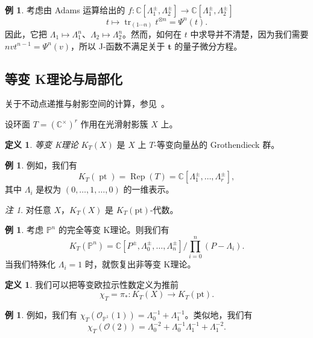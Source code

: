 \documentclass{amsart}
\theoremstyle{definition}
\newtheorem{defn}[thm]{定义}
\newtheorem{exm}[thm]{例}
\theoremstyle{remark}
\newtheorem{rmk}[thm]{注}
\theoremstyle{plain}
\theoremstyle{definition}
\theoremstyle{remark}
\newcommand{\C}{\mathbb{C}}
\renewcommand{\P}{\mathbb{P}}
\newcommand{\mc}[1]{\mathcal{#1}}
\newcommand{\mr}[1]{\mathrm{#1}}
\newcommand{\on}[1]{\operatorname{#1}}
\newcommand{\1}{\mathbf{1}}
\newcommand{\2}{\mathbf{2}}
\newcommand{\3}{\mathbf{3}}
\begin{document}
\begin{exm}
    考虑由 Adams 运算给出的 \(f \colon \C[\Lambda_1^{\pm}, \Lambda_2^{\pm}] \to \C[\Lambda_1^{\pm}, \Lambda_2^{\pm}]\)
    \[ t \mapsto \on{tr}_{(1\cdots n)} t^{\otimes n} = \Psi^n (t). \]
    因此，它把 \(\Lambda_1 \mapsto \Lambda_1^n\)、\(\Lambda_2 \mapsto \Lambda_2^n\)。然而，如何在 \(t\) 中求导并不清楚，因为我们需要 \(nv t^{n-1} = \Psi^n(v)\)，所以 J-函数不满足关于 \(\mathbf{t}\) 的量子微分方程。
\end{exm}

\subsection{等变 K理论与局部化}%
\label{sub:Equivariant K-theory and localization}

关于不动点递推与射影空间的计算，参见~\cite{GiventalK2}。

设环面 \(T = (\C^{\times})^r\) 作用在光滑射影簇 \(X\) 上。

\begin{defn}
    \textit{等变 K理论} \(K_T(X)\) 是 \(X\) 上 \(T\)-等变向量丛的 Grothendieck 群。
\end{defn}

\begin{exm}
    例如，我们有
    \[ K_T(\on{pt}) = \on{Rep}(T) = \C[\Lambda_1^{\pm}, \ldots, \Lambda_r^{\pm}], \]
    其中 \(\Lambda_i\) 是权为 \((0, \ldots, 1, \ldots, 0)\) 的一维表示。
\end{exm}

\begin{rmk}
    对任意 \(X\)，\(K_T(X)\) 是 \(K_T(\mr{pt})\)-代数。
\end{rmk}

\begin{exm}
    考虑 \(\P^n\) 的完全等变 K理论。则我们有
    \[ K_T(\P^n) = \C[P^{\pm}, \Lambda_0^{\pm}, \ldots, \Lambda_n^{\pm}] \big/ \prod_{i=0}^n (P-\Lambda_i). \]
    当我们特殊化 \(\Lambda_i = 1\) 时，就恢复出非等变 K理论。
\end{exm}

\begin{defn}
    我们可以把等变欧拉示性数定义为推前
    \[ \chi_T = \pi_* \colon K_T(X) \to K_T(\mr{pt}). \]
\end{defn}

\begin{exm}
    例如，我们有 \(\chi_T(\mc{O}_{\P^1}(1)) = \Lambda_0^{-1} + \Lambda_1^{-1}\)。类似地，我们有
    \[ \chi_T(\mc{O}(2)) = \Lambda_0^{-2} + \Lambda_0^{-1} \Lambda_1^{-1} + \Lambda_1^{-2}. \]
\end{exm}
\end{document}
